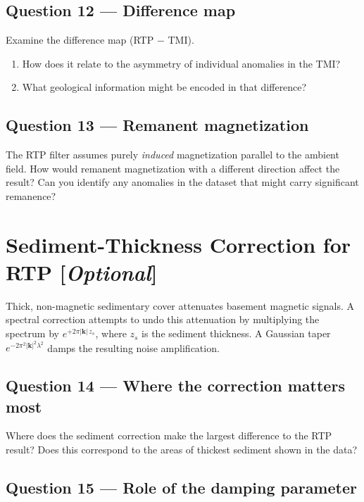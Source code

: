 \documentclass[11pt]{article}
\begin{document}
\subsection*{Question 12 — Difference map}

Examine the difference map (RTP $-$ TMI).
\begin{enumerate}[label=\alph*.]
  \item How does it relate to the asymmetry of individual anomalies in the TMI?
  \item What geological information might be encoded in that difference?
\end{enumerate}

\subsection*{Question 13 — Remanent magnetization}

The RTP filter assumes purely \emph{induced} magnetization parallel to the
ambient field.  How would remanent magnetization with a different direction affect
the result?  Can you identify any anomalies in the dataset that might carry
significant remanence?

\section{Sediment-Thickness Correction for RTP [\emph{Optional}]}

Thick, non-magnetic sedimentary cover attenuates basement magnetic signals.
A spectral correction attempts to undo this attenuation by multiplying the
spectrum by $e^{+2\pi|\mathbf{k}|\,z_s}$, where $z_s$ is the sediment thickness.
A Gaussian taper $e^{-2\pi^2|\mathbf{k}|^2\lambda^2}$ damps the resulting
noise amplification.

\subsection*{Question 14 — Where the correction matters most}

Where does the sediment correction make the largest difference to the RTP result?
Does this correspond to the areas of thickest sediment shown in the data?

\subsection*{Question 15 — Role of the damping parameter}
\end{document}
